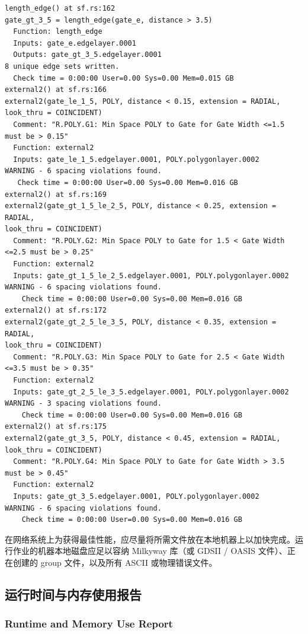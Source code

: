 \begin{lstlisting}[caption={cell.sum 文件中的部分内存使用信息示例},label={ex:cell-sum-mem}]
length_edge() at sf.rs:162
gate_gt_3_5 = length_edge(gate_e, distance > 3.5)
  Function: length_edge
  Inputs: gate_e.edgelayer.0001
  Outputs: gate_gt_3_5.edgelayer.0001
8 unique edge sets written.
  Check time = 0:00:00 User=0.00 Sys=0.00 Mem=0.015 GB
external2() at sf.rs:166
external2(gate_le_1_5, POLY, distance < 0.15, extension = RADIAL,
look_thru = COINCIDENT)
  Comment: "R.POLY.G1: Min Space POLY to Gate for Gate Width <=1.5 must be > 0.15"
  Function: external2
  Inputs: gate_le_1_5.edgelayer.0001, POLY.polygonlayer.0002
WARNING - 6 spacing violations found.
   Check time = 0:00:00 User=0.00 Sys=0.00 Mem=0.016 GB
external2() at sf.rs:169
external2(gate_gt_1_5_le_2_5, POLY, distance < 0.25, extension = RADIAL,
look_thru = COINCIDENT)
  Comment: "R.POLY.G2: Min Space POLY to Gate for 1.5 < Gate Width <=2.5 must be > 0.25"
  Function: external2
  Inputs: gate_gt_1_5_le_2_5.edgelayer.0001, POLY.polygonlayer.0002
WARNING - 6 spacing violations found.
    Check time = 0:00:00 User=0.00 Sys=0.00 Mem=0.016 GB
external2() at sf.rs:172
external2(gate_gt_2_5_le_3_5, POLY, distance < 0.35, extension = RADIAL,
look_thru = COINCIDENT)
  Comment: "R.POLY.G3: Min Space POLY to Gate for 2.5 < Gate Width <=3.5 must be > 0.35"
  Function: external2
  Inputs: gate_gt_2_5_le_3_5.edgelayer.0001, POLY.polygonlayer.0002
WARNING - 3 spacing violations found.
    Check time = 0:00:00 User=0.00 Sys=0.00 Mem=0.016 GB
external2() at sf.rs:175
external2(gate_gt_3_5, POLY, distance < 0.45, extension = RADIAL,
look_thru = COINCIDENT)
  Comment: "R.POLY.G4: Min Space POLY to Gate for Gate Width > 3.5 must be > 0.45"
  Function: external2
  Inputs: gate_gt_3_5.edgelayer.0001, POLY.polygonlayer.0002
WARNING - 6 spacing violations found.
    Check time = 0:00:00 User=0.00 Sys=0.00 Mem=0.016 GB
\end{lstlisting}

在网络系统上为获得最佳性能，应尽量将所需文件放在本地机器上以加快完成。运行作业的机器本地磁盘应足以容纳 Milkyway 库（或 GDSII / OASIS 文件）、正在创建的 group 文件，以及所有 ASCII 或物理错误文件。

\subsection{运行时间与内存使用报告}
\subsubsection*{Runtime and Memory Use Report}

